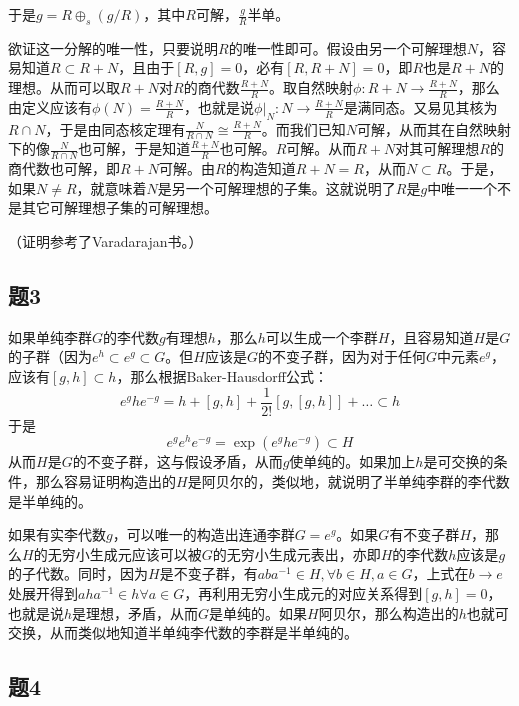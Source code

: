 \documentclass{ctexart}
\begin{document}
	于是$g=R\oplus_s(g/R)$，其中$R$可解，$\frac{g}{R}$半单。
	
	欲证这一分解的唯一性，只要说明$R$的唯一性即可。假设由另一个可解理想$N$，容易知道$R\subset R+N$，且由于$[R,g]=0$，必有$[R,R+N]=0$，即$R$也是$R+N$的理想。从而可以取$R+N$对$R$的商代数$\frac{R+N}{R}$。取自然映射$\phi:R+N\to\frac{R+N}{R}$，那么由定义应该有$\phi(N)=\frac{R+N}{R}$，也就是说$\phi|_N:N\to\frac{R+N}{R}$是满同态。又易见其核为$R\cap N$，于是由同态核定理有$\frac{N}{R\cap N}\cong \frac{R+N}{R}$。而我们已知$N$可解，从而其在自然映射下的像$\frac{N}{R\cap N}$也可解，于是知道$\frac{R+N}{R}$也可解。$R$可解。从而$R+N$对其可解理想$R$的商代数也可解，即$R+N$可解。由$R$的构造知道$R+N=R$，从而$N\subset R$。于是，如果$N\neq R$，就意味着$N$是另一个可解理想的子集。这就说明了$R$是$g$中唯一一个不是其它可解理想子集的可解理想。
	
	（证明参考了Varadarajan书。）
	
	\subsection{题3}
	
	如果单纯李群$G$的李代数$g$有理想$h$，那么$h$可以生成一个李群$H$，且容易知道$H$是$G$的子群（因为$e^{h}\subset e^{g}\subset G$。但$H$应该是$G$的不变子群，因为对于任何$G$中元素$e^{g}$，应该有$[g,h]\subset h$，那么根据Baker-Hausdorff公式：
	\begin{equation}
	e^{g}he^{-g}=h+[g,h]+\frac{1}{2!}[g,[g,h]]+\dots\subset h
	\end{equation}
	于是
	\begin{equation}
	e^{g}e^{h}e^{-g}=\exp\left(e^g h e^{-g}\right)\subset H
	\end{equation}
	从而$H$是$G$的不变子群，这与假设矛盾，从而$g$使单纯的。如果加上$h$是可交换的条件，那么容易证明构造出的$H$是阿贝尔的，类似地，就说明了半单纯李群的李代数是半单纯的。
	
	如果有实李代数$g$，可以唯一的构造出连通李群$G=e^{g}$。如果$G$有不变子群$H$，那么$H$的无穷小生成元应该可以被$G$的无穷小生成元表出，亦即$H$的李代数$h$应该是$g$的子代数。同时，因为$H$是不变子群，有$aba^{-1}\in H,\forall b\in H,a\in G$，上式在$b\to e$处展开得到$aha^{-1}\in h\forall a\in G$，再利用无穷小生成元的对应关系得到$[g,h]=0$，也就是说$h$是理想，矛盾，从而$G$是单纯的。如果$H$阿贝尔，那么构造出的$h$也就可交换，从而类似地知道半单纯李代数的李群是半单纯的。
	
	\subsection{题4}
	
\end{document}
